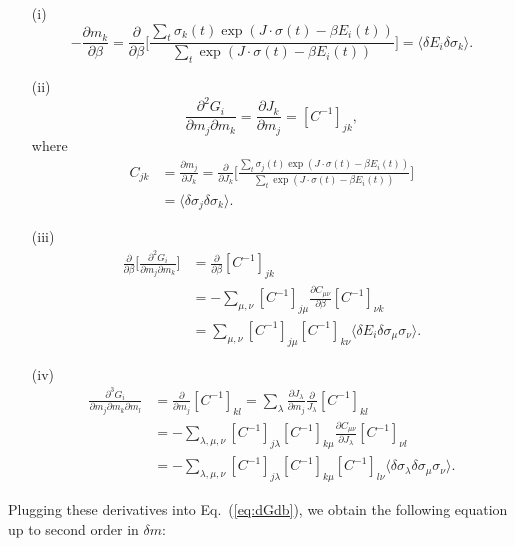 \documentclass[prx,twocolumn,twoside,showpacs,superscriptaddress]{revtex4-1}
\begin{document}
\begin{itemize}
\item[(i)]
\begin{equation}
-\frac{\partial m_k}{\partial \beta} = \frac{\partial}{\partial \beta} \bigg[ \frac{\sum_{t} \sigma_k(t) \exp (J\cdot \sigma(t) - \beta E_i(t))}{\sum_{t} \exp (J\cdot \sigma(t) - \beta E_i(t))} \bigg] =\langle \delta E_i \delta \sigma_k \rangle.
\end{equation}
\item[(ii)]
\begin{equation}
\frac{\partial^2 G_i}{\partial m_j \partial m_k} = \frac{\partial J_k}{\partial m_j}=[C^{-1}]_{jk},
\end{equation}
where 
\begin{align}
C_{jk} &= \frac{\partial m_j}{\partial J_k}= \frac{\partial}{\partial J_k} \bigg[ \frac{\sum_{t} \sigma_j(t) \exp (J\cdot \sigma(t) - \beta E_i(t))}{\sum_{t} \exp (J\cdot \sigma(t) - \beta E_i(t))} \bigg] \nonumber \\
& =\langle \delta \sigma_j \delta \sigma_k \rangle.
\end{align}
\item[(iii)]
\begin{align}
\frac{\partial}{\partial \beta} \bigg[ \frac{\partial^2 G_i}{\partial m_j \partial m_k} \bigg] &= \frac{\partial }{\partial \beta} [C^{-1}]_{jk}  \nonumber \\
&= - \sum_{\mu, \nu} [C^{-1}]_{j \mu} \frac{\partial C_{\mu \nu}}{\partial \beta} [C^{-1}]_{\nu k}  \nonumber \\
&= \sum_{\mu, \nu} [C^{-1}]_{j \mu} [C^{-1}]_{k \nu} \langle \delta E_i \delta \sigma_\mu \sigma_\nu \rangle. 
\end{align}
\item[(iv)]
\begin{align}
\frac{\partial^3 G_i}{\partial m_j \partial m_k \partial m_l} &= \frac{\partial }{\partial m_j} [C^{-1}]_{kl} 
= \sum_\lambda \frac{\partial J_\lambda}{\partial m_j} \frac{\partial}{J_\lambda} [C^{-1}]_{kl} \nonumber \\
&= - \sum_{\lambda, \mu, \nu} [C^{-1}]_{j \lambda} [C^{-1}]_{k \mu} \frac{\partial C_{\mu \nu}}{\partial J_\lambda} [C^{-1}]_{\nu l}  \nonumber \\
&= - \sum_{\lambda, \mu, \nu} [C^{-1}]_{j \lambda}[C^{-1}]_{k \mu} [C^{-1}]_{l \nu} \langle \delta \sigma_\lambda \delta \sigma_\mu \sigma_\nu \rangle.
\end{align}
\end{itemize}
Plugging these derivatives into Eq.~(\ref{eq:dGdb}), we obtain the following equation up to second order in $\delta m$:
\end{document}
